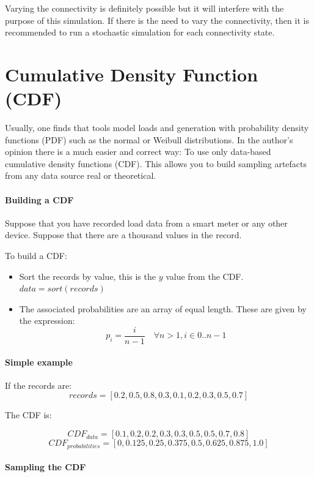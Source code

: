 \documentclass[a4paper,twoside,fleqn]{tufte-book}
\begin{document}
Varying the connectivity is definitely possible but it will interfere with the purpose of this simulation. If there is the need to vary the connectivity, then it is recommended to run a stochastic simulation for each connectivity state.

\section{Cumulative Density Function (CDF)}

Usually, one finds that tools model loads and generation with probability density functions (PDF) such as the normal or Weibull distributions. In the author's opinion there is a much easier and correct way: To use only data-based cumulative density functions (CDF). This allows you to build sampling artefacts from any data source real or theoretical.

\paragraph{Building a CDF}

Suppose that you have recorded load data from a smart meter or any other device. Suppose that there are a thousand values in the record.

To build a CDF:

\begin{itemize}
	\item Sort the records by value, this is the $y$ value from the CDF. $data = sort(records)$
	\item The associated probabilities are an array of equal length. These are given by the expression: $$p_i = \frac{i}{n-1} \quad \forall n > 1, i \in {0..n-1}$$
\end{itemize}

\paragraph{Simple example}

If the records are:
$$
records = [0.2, 0.5, 0.8, 0.3, 0.1, 0.2, 0.3, 0.5, 0.7]
$$

The CDF is:

$$
CDF_{data} = [0.1, 0.2, 0.2, 0.3, 0.3, 0.5, 0.5, 0.7, 0.8]
$$
$$
CDF_{probabilities} = [0, 0.125, 0.25, 0.375, 0.5, 0.625, 0.875, 1.0]
$$

\paragraph{Sampling the CDF}
\end{document}
